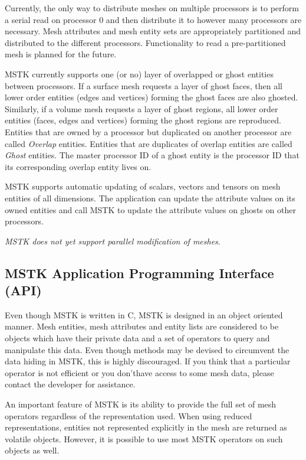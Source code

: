 \documentclass[12pt]{article}
\begin{document}
Currently, the only way to distribute meshes on multiple processors is
to perform a serial read on processor 0 and then distribute it to
however many processors are necessary. Mesh attributes and mesh entity
sets are appropriately partitioned and distributed to the different
processors. Functionality to read a pre-partitioned mesh is planned
for the future.

MSTK currently supports one (or no) layer of overlapped or ghost
entities between processors. If a surface mesh requests a layer of
ghost faces, then all lower order entities (edges and vertices)
forming the ghost faces are also ghosted. Similarly, if a volume mesh
requests a layer of ghost regions, all lower order entities (faces,
edges and vertices) forming the ghost regions are reproduced. Entities
that are owned by a processor but duplicated on another processor are
called {\em Overlap} entities. Entities that are duplicates of overlap
entities are called {\em Ghost} entities. The master processor ID of a
ghost entity is the processor ID that its corresponding overlap entity
lives on.

MSTK supports automatic updating of scalars, vectors and tensors on
mesh entities of all dimensions. The application can update the
attribute values on its owned entities and call MSTK to update the
attribute values on ghosts on other processors.

\textit{MSTK does not yet support parallel modification of meshes}.

\subsection{MSTK Application Programming Interface (API)}

Even though MSTK is written in C, MSTK is designed in an object
oriented manner. Mesh entities, mesh attributes and entity lists are
considered to be objects which have their private data and a set of
operators to query and manipulate this data. Even though methods may
be devised to circumvent the data hiding in MSTK, this is highly
discouraged. If you think that a particular operator is not efficient
or you don'thave access to some mesh data, please contact the
developer for assistance.

An important feature of MSTK is its ability to provide the full set of
mesh operators regardless of the representation used. When using
reduced representations, entities not represented explicitly in the
mesh are returned as volatile objects. However, it is possible to use
most MSTK operators on such objects as well.
\end{document}
